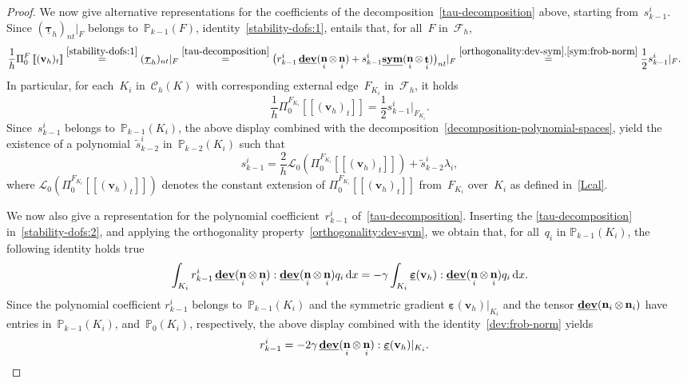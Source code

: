 \documentclass[10pt,a4paper]{amsart}
\newcommand{\Ccalh}{\mathcal{C}_h}
\newcommand{\CcalhK}{\Ccalh(\K)}
\newcommand{\F}{F}
\newcommand{\Fcalh}{\mathcal{F}_h}
\newcommand{\Fi}{{\F_{\Ki}}}
\newcommand{\K}{K}
\newcommand{\Ki}{{\K_i}}
\newcommand{\Lcalzero}{\mathcal{L}_0}
\newcommand{\Pbb}{\mathbb{P}}
\newcommand{\Pbbkmo}{\mathbb{P}_{k-1}}
\newcommand{\Pbbkmt}{\mathbb{P}_{k-2}}
\newcommand{\Pbbz}{\Pbb_0}
\newcommand{\PizF}{\Pi_0^{\F}}
\newcommand{\PizFi}{\Pi_0^{\Fi}}
\DeclareMathOperator{\dev}{\underline{\mathbf{dev}}}
\newcommand{\dx}{\, \mathrm{d}x}
\newcommand{\epsbfun}{\underline{\boldsymbol{\varepsilon}}}
\newcommand{\jump}[1]{\left[\!\left[#1\right]\!\right]}
\newcommand{\lambdai}{\lambda_i}
\DeclareMathOperator{\norm}{\bf{n}}
\newcommand{\normi}{\norm_i}
\newcommand{\normtang}{{nt}}
\newcommand{\qi}{q_{i}}
\newcommand{\rkmoi}{r_{k-1}^i}
\newcommand{\skmoi}{s_{k-1}^i}
\newcommand{\stildekmt}{\widetilde{s}_{k-2}}
\newcommand{\stildekmti}{\stildekmt^i}
\newcommand{\sym}{\underline{\bf{sym}}}
\DeclareMathOperator{\tang}{\bf{t}}
\newcommand{\tangi}{\tang_i}
\newcommand{\tangscalar}{t}
\newcommand{\taubfh}{\underline{\boldsymbol{\tau}}_h}
\newcommand{\vbfh}{\mathbf{v}_h}
\begin{document}
\begin{proof}
We now give alternative representations
for the coefficients of the decomposition~\eqref{tau-decomposition} above,
starting from~$\skmoi$.
Since $(\taubfh)_{\normtang}|_{\F}$
belongs to~$\Pbbkmo(\F)$,
identity~\eqref{stability-dofs:1},
entails that,
for all~$\F$ in~$\Fcalh$,
\begin{equation*}
\begin{split}
\frac{1}{h}\PizF\jump{(\vbfh)_{\tangscalar}}
\overset{\eqref{stability-dofs:1}}{=}
(\taubfh)_{\normtang}|_{\F} 
&\overset{\eqref{tau-decomposition}}{=}
\big(\rkmoi\dev(\normi\otimes\normi) + \skmoi\sym(\normi\otimes\tangi)\big)_{\normtang}|_{\F} 
\overset{\eqref{orthogonality:dev-sym},\eqref{sym:frob-norm}}{=}
\frac{1}{2}\skmoi|_{\F}.
\end{split}
\end{equation*}
In particular,
for each~$\Ki$ in~$\CcalhK$
with corresponding external edge~$\Fi$ in~$\Fcalh$,
it holds
\begin{equation}  \label{skmoi-value-on-edge}
\frac{1}{h}\PizFi\jump{(\vbfh)_{\tangscalar}}
= \frac{1}{2}\skmoi|_{\Fi}.
\end{equation}
Since~$\skmoi$ belongs to~$\Pbbkmo(\Ki)$,
the above display combined with the decomposition~\eqref{decomposition-polynomial-spaces},
yield the existence of a polynomial~$\stildekmti$ in~$\Pbbkmt(\Ki)$
such that
\begin{equation} \label{skmoi-stildekmti}
\skmoi = \frac{2}{h}\Lcalzero(\PizFi\jump{(\vbfh)_{\tangscalar}}) + \stildekmti\lambdai,
\end{equation}
where
$\Lcalzero(\PizFi\jump{(\vbfh)_{\tangscalar}})$ denotes
the constant extension of $\PizFi\jump{(\vbfh)_{\tangscalar}}$ from~$\Fi$ over~$\Ki$
as defined in~\eqref{Lcal}.

We now also give a representation for the polynomial coefficient~$\rkmoi$ of~\eqref{tau-decomposition}.
Inserting the \eqref{tau-decomposition}
in~\eqref{stability-dofs:2},
and applying the orthogonality property~\eqref{orthogonality:dev-sym},
we obtain that,
for all~$\qi$ in $\Pbbkmo(\Ki)$,
the following identity holds true
\begin{equation*} \label{rkmoi-integral-value}
\int_{\Ki} \rkmoi \dev(\normi\otimes\normi) : \dev(\normi\otimes\normi) \qi \dx = - \gamma\int_{\Ki} \epsbfun(\vbfh) : \dev(\normi\otimes\normi) \qi \dx.
\end{equation*}
Since the polynomial coefficient $\rkmoi$
belongs to~$\Pbbkmo(\Ki)$
and the symmetric gradient $\epsbfun(\vbfh)|_{\Ki}$
and the tensor $\dev(\normi\otimes\normi)$
have entries in~$\Pbbkmo(\Ki)$, and~$\Pbbz(\Ki)$,
respectively,
the above display
combined with the identity~\eqref{dev:frob-norm}
yields
\begin{equation} \label{rkmoi-value}
\begin{split}
\rkmoi
&= -2\gamma \dev(\normi\otimes\normi) : \epsbfun(\vbfh)|_{\Ki}.
\end{split}
\end{equation}


\end{proof}
\end{document}
